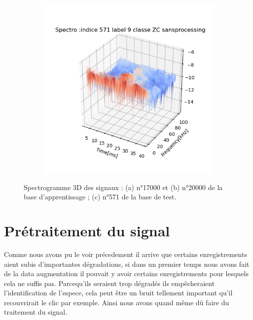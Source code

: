 \begin{figure}[!h]
\begin{subfigure}[b]{0.3\textwidth}
  \end{subfigure}
  \begin{subfigure}[b]{0.3\textwidth}
    \includegraphics[width=\textwidth]{./images/indice571Spectro3Dlabel9classeZCsansprocessingsanszoom.png}
  \end{subfigure}
  \caption{Spectrogramme 3D des signaux : (a) n°17000 et (b) n°20000 de la base d'apprentissage ; (c) n°571 de la base de test.%
  \label{fig:spectros3D}}
\end{figure}

\hypertarget{Traitement-du-signal}{%
\section{Prétraitement du signal}
\label{Traitement-du-signal}}

Comme nous avons pu le voir précedement il arrive que certains enregistrements aient subis d'importantes dégradations, si dans un premier temps nous avons fait de la data augmentation il pouvait y avoir certains enregistrements pour lesquels cela ne suffis pas. Parcequ'ils seraient trop dégradés ils empêcheraient l'identification de l'espece, cela peut être un bruit tellement important qu'il recouvrirait le clic par exemple. Ainsi nous avons quand même dû faire du traitement du signal.

